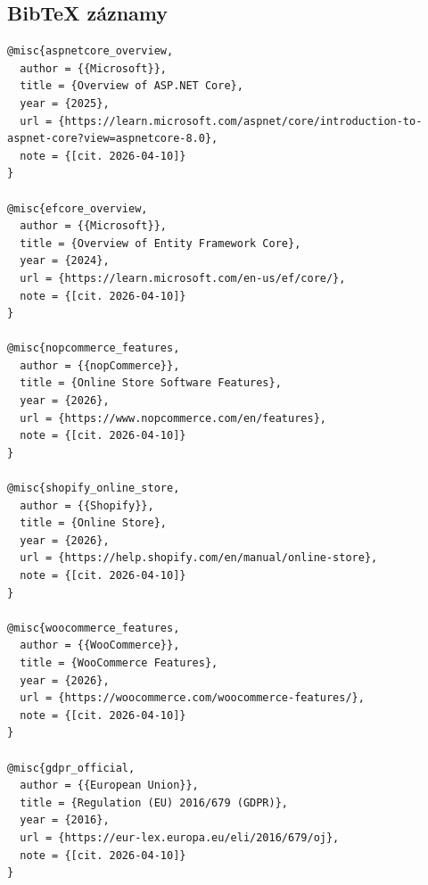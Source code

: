 \subsection*{BibTeX záznamy}
\begin{verbatim}
@misc{aspnetcore_overview,
  author = {{Microsoft}},
  title = {Overview of ASP.NET Core},
  year = {2025},
  url = {https://learn.microsoft.com/aspnet/core/introduction-to-aspnet-core?view=aspnetcore-8.0},
  note = {[cit. 2026-04-10]}
}

@misc{efcore_overview,
  author = {{Microsoft}},
  title = {Overview of Entity Framework Core},
  year = {2024},
  url = {https://learn.microsoft.com/en-us/ef/core/},
  note = {[cit. 2026-04-10]}
}

@misc{nopcommerce_features,
  author = {{nopCommerce}},
  title = {Online Store Software Features},
  year = {2026},
  url = {https://www.nopcommerce.com/en/features},
  note = {[cit. 2026-04-10]}
}

@misc{shopify_online_store,
  author = {{Shopify}},
  title = {Online Store},
  year = {2026},
  url = {https://help.shopify.com/en/manual/online-store},
  note = {[cit. 2026-04-10]}
}

@misc{woocommerce_features,
  author = {{WooCommerce}},
  title = {WooCommerce Features},
  year = {2026},
  url = {https://woocommerce.com/woocommerce-features/},
  note = {[cit. 2026-04-10]}
}

@misc{gdpr_official,
  author = {{European Union}},
  title = {Regulation (EU) 2016/679 (GDPR)},
  year = {2016},
  url = {https://eur-lex.europa.eu/eli/2016/679/oj},
  note = {[cit. 2026-04-10]}
}
\end{verbatim}
